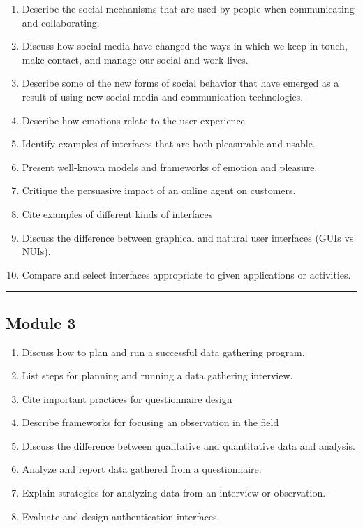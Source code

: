 \documentclass[]{article}
\providecommand{\tightlist}{%
  \setlength{\itemsep}{0pt}\setlength{\parskip}{0pt}}
\begin{document}
\begin{enumerate}
\def\labelenumi{\arabic{enumi}.}
\tightlist
\item
  Describe the social mechanisms that are used by people when
  communicating and collaborating.
\item
  Discuss how social media have changed the ways in which we keep in
  touch, make contact, and manage our social and work lives.
\item
  Describe some of the new forms of social behavior that have emerged as
  a result of using new social media and communication technologies.
\item
  Describe how emotions relate to the user experience
\item
  Identify examples of interfaces that are both pleasurable and usable.
\item
  Present well-known models and frameworks of emotion and pleasure.
\item
  Critique the persuasive impact of an online agent on customers.
\item
  Cite examples of different kinds of interfaces
\item
  Discuss the difference between graphical and natural user interfaces
  (GUIs vs NUIs).
\item
  Compare and select interfaces appropriate to given applications or
  activities.
\end{enumerate}

\begin{center}\rule{0.5\linewidth}{\linethickness}\end{center}

\hypertarget{module-3}{%
\subsection{Module 3}\label{module-3}}

\begin{enumerate}
\def\labelenumi{\arabic{enumi}.}
\tightlist
\item
  Discuss how to plan and run a successful data gathering program.
\item
  List steps for planning and running a data gathering interview.
\item
  Cite important practices for questionnaire design
\item
  Describe frameworks for focusing an observation in the field
\item
  Discuss the difference between qualitative and quantitative data and
  analysis.
\item
  Analyze and report data gathered from a questionnaire.
\item
  Explain strategies for analyzing data from an interview or
  observation.
\item
  Evaluate and design authentication interfaces.
\end{enumerate}
\end{document}
